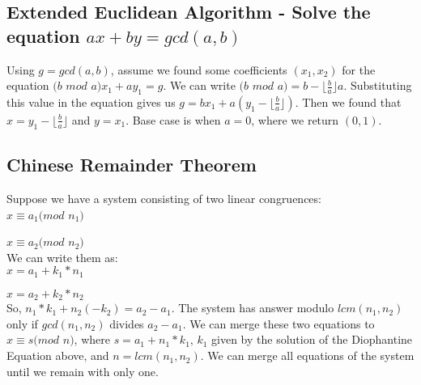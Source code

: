 \documentclass[12pt]{article}%
\begin{document}
\subsection{Extended Euclidean Algorithm - Solve the equation $ax + by = gcd(a,b)$}

Using $g = gcd(a,b)$, assume we found some coefficients $(x_1,x_2)$ for the equation $(b$ $mod$ $a)x_1 + ay_1 = g$. We can write $(b$ $mod$ $a) = b - \lfloor \frac{b}{a} \rfloor a$. Substituting this value in the equation gives us $g = bx_1 + a (y_1 - \lfloor \frac{b}{a} \rfloor)$. Then we found that $x = y_1 - \lfloor \frac{b}{a} \rfloor$ and $y = x_1$. Base case is when $a = 0$, where we return $(0,1)$.

\subsection{Chinese Remainder Theorem}

Suppose we have a system consisting of two linear congruences:\\

\hspace{2mm} $x \equiv a_1 (mod$ $n_1)$ 

\hspace{2mm} $x \equiv a_2 (mod$ $n_2)$\\

We can write them as:\\
 
\hspace{2mm} $x = a_1  + k_1*n_1$ 

\hspace{2mm} $x = a_2  + k_2*n_2$\\
 

So, $n_1*k_1 + n_2(-k_2) = a_2 - a_1$. The system has answer modulo $lcm(n_1, n_2)$ only if $gcd(n_1,n_2)$ divides $a_2 - a_1$. We can merge these two equations to $x \equiv s (mod$ $n)$, where $s = a_1 + n_1*k_1$, $k_1$ given by the solution of the Diophantine Equation above, and $n = lcm(n_1, n_2)$. We can merge all equations of the system until we remain with only one.
\end{document}
